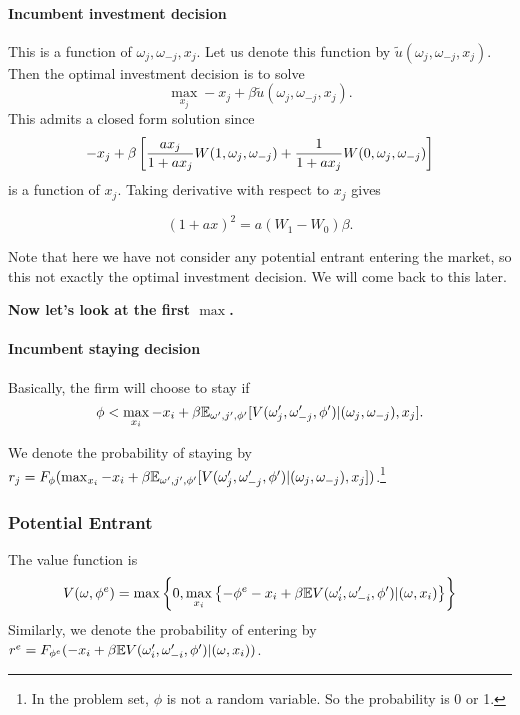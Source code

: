 \documentclass[12pt]{article}[margin=1in]
\begin{document}
\paragraph{Incumbent investment decision}This is a function of $\omega_j, \omega_{-j}, x_j$. Let us denote this function by $\tilde{u}(\omega_j, \omega_{-j}, x_j)$.
Then the optimal investment decision is to solve
$$\max_{x_j} -x_j+\beta \tilde{u}(\omega_j, \omega_{-j}, x_j).$$
This admits a closed form solution since 
$$ -x_j + \beta\left[\frac{ax_j}{1+ax_j}W(1, \omega_j,\omega_{-j})+\frac{1}{1+ax_j}W(0, \omega_j,\omega_{-j})\right]$$
is a function of $x_j$.
Taking derivative with respect to $x_j$ gives

$$(1+ax)^2=a(W_1-W_0)\beta.$$

Note that here we have not consider any potential entrant entering the market, so this not exactly the optimal investment decision. We will come back to this later.


\textbf{Now let's look at the first $\max$.}
\paragraph{Incumbent staying decision} Basically, the firm will choose to stay if 
$$\phi<\max_{x_i}-x_i+\beta\mathbb{E}_{\omega',j',\phi'}[V(\omega_j',\omega_{-j}',\phi')|(\omega_j, \omega_{-j}),x_j].$$

 We denote the probability of staying by $r_j = F_\phi(\max_{x_i}-x_i+\beta\mathbb{E}_{\omega',j',\phi'}[V(\omega_j',\omega_{-j}',\phi')|(\omega_j, \omega_{-j}),x_j])$.\footnote{In the problem set, $\phi$ is not a random variable. So the probability is 0 or 1.}


\subsubsection{Potential Entrant} The value function is
\begin{equation*}
    V(\omega, \phi^e) = \max\left\{0,\max_{x_i}\left\{-\phi^e-x_i+\beta\mathbb{E}{V(\omega_i',\omega_{-i}',\phi')|(\omega, x_i)}\right\}\right\}
\end{equation*}
Similarly, we denote the probability of entering by $r^e=F_{\phi^e}(-x_i+\beta\mathbb{E}{V(\omega_i',\omega_{-i}',\phi')|(\omega, x_i)})$.
\end{document}
